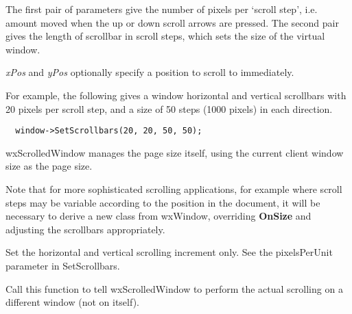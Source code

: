 The first pair of parameters give the number of pixels per `scroll step', i.e. amount
moved when the up or down scroll arrows are pressed.
The second pair gives the length of scrollbar in scroll steps, which sets the size of the virtual
window.

{\it xPos} and {\it yPos} optionally specify a position to scroll to immediately.

For example, the following gives a window horizontal and vertical
scrollbars with 20 pixels per scroll step, and a size of 50 steps (1000
pixels) in each direction.

\begin{verbatim}
  window->SetScrollbars(20, 20, 50, 50);
\end{verbatim}

wxScrolledWindow manages the page size itself,
using the current client window size as the page size.

Note that for more sophisticated scrolling applications, for example where
scroll steps may be variable according to the position in the document, it will be
necessary to derive a new class from wxWindow, overriding {\bf OnSize} and
adjusting the scrollbars appropriately.



\label{wxscrolledwindowsetscrollrate}


Set the horizontal and vertical scrolling increment only.  See the pixelsPerUnit
parameter in SetScrollbars.

\label{wxscrolledwindowsettargetwindow}


Call this function to tell wxScrolledWindow to perform the actual scrolling on
a different window (not on itself).

